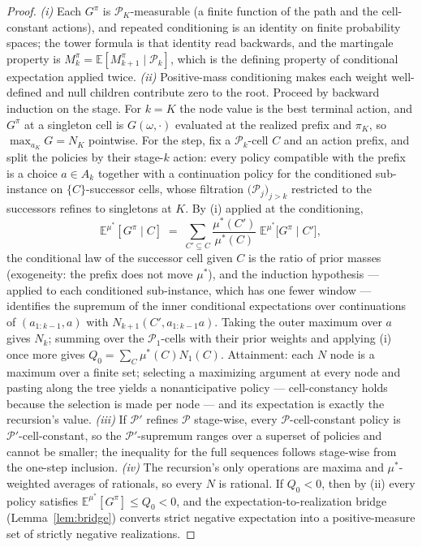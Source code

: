 \documentclass[10pt,twocolumn]{article}
\theoremstyle{definition}
\begin{document}
\begin{proof}
\emph{(i)} Each $G^{\pi}$ is $\mathcal{P}_{K}$-measurable (a finite
function of the path and the cell-constant actions), and repeated
conditioning is an identity on finite probability spaces; the tower
formula is that identity read backwards, and the martingale property is
$M^{\pi}_{k} = \mathbb{E}[M^{\pi}_{k+1} \mid \mathcal{P}_{k}]$, which
is the defining property of conditional expectation applied twice.
\emph{(ii)} Positive-mass conditioning makes each weight
well-defined and null children contribute zero to the root. Proceed
by backward induction on the stage. For $k = K$ the node
value is the best terminal action, and $G^{\pi}$ at a singleton cell is
$G(\omega, \cdot)$ evaluated at the realized prefix and $\pi_{K}$, so
$\max_{a_{K}} G = N_{K}$ pointwise. For the step, fix a
$\mathcal{P}_{k}$-cell $C$ and an action prefix, and split the policies
by their stage-$k$ action: every policy compatible with the prefix is a
choice $a \in A_{k}$ together with a continuation policy for the
conditioned sub-instance on $\{C\}$-successor cells, whose filtration
$\bigl(\mathcal{P}_{j}\bigr)_{j > k}$ restricted to the successors
refines to singletons at $K$. By (i) applied at the conditioning,
\[
\mathbb{E}^{\mu^{*}}[G^{\pi} \mid C] \;=\;
\sum_{C' \subseteq C} \frac{\mu^{*}(C')}{\mu^{*}(C)}\;
\mathbb{E}^{\mu^{*}}\bigl[G^{\pi} \mid C'\bigr],
\]
the conditional law of the successor cell given $C$ is the ratio of
prior masses (exogeneity: the prefix does not move $\mu^{*}$), and the
induction hypothesis --- applied to each conditioned sub-instance,
which has one fewer window --- identifies the supremum of the inner
conditional expectations over continuations of $(a_{1:k-1}, a)$ with
$N_{k+1}(C', a_{1:k-1}a)$. Taking the outer maximum over $a$ gives
$N_{k}$; summing over the $\mathcal{P}_{1}$-cells with their prior
weights and applying (i) once more gives $Q_{0} = \sum_{C}
\mu^{*}(C) N_{1}(C)$. Attainment: each $N$ node is a maximum over a
finite set; selecting a maximizing argument at every node and pasting
along the tree yields a nonanticipative policy --- cell-constancy holds
because the selection is made per node --- and its expectation is
exactly the recursion's value. \emph{(iii)} If $\mathcal{P}'$ refines
$\mathcal{P}$ stage-wise, every $\mathcal{P}$-cell-constant policy is
$\mathcal{P}'$-cell-constant, so the $\mathcal{P}'$-supremum ranges
over a superset of policies and cannot be smaller; the inequality for
the full sequences follows stage-wise from the one-step inclusion.
\emph{(iv)} The recursion's only operations are maxima and
$\mu^{*}$-weighted averages of rationals, so every $N$ is rational. If
$Q_{0} < 0$, then by (ii) every policy satisfies
$\mathbb{E}^{\mu^{*}}[G^{\pi}] \le Q_{0} < 0$, and the
expectation-to-realization bridge (Lemma~\ref{lem:bridge}) converts strict negative expectation into a
positive-measure set of strictly negative realizations.
\end{proof}
\end{document}
